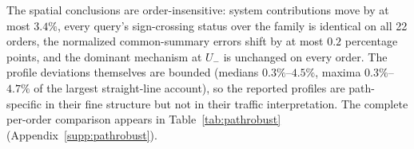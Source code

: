 The spatial conclusions are order-insensitive: system contributions move by at most
$3.4\%$, every query's sign-crossing status over the family is
identical on all 22 orders, the normalized common-summary errors shift
by at most $0.2$ percentage points, and the dominant mechanism at $U_-$
is unchanged on every order. The profile deviations themselves are
bounded (medians $0.3\%$--$4.5\%$, maxima $0.3\%$--$4.7\%$ of the
largest straight-line account), so the reported profiles are
path-specific in their fine structure but not in their traffic
interpretation. The complete per-order comparison appears in
Table~\ref{tab:pathrobust} (Appendix~\ref{supp:pathrobust}).
